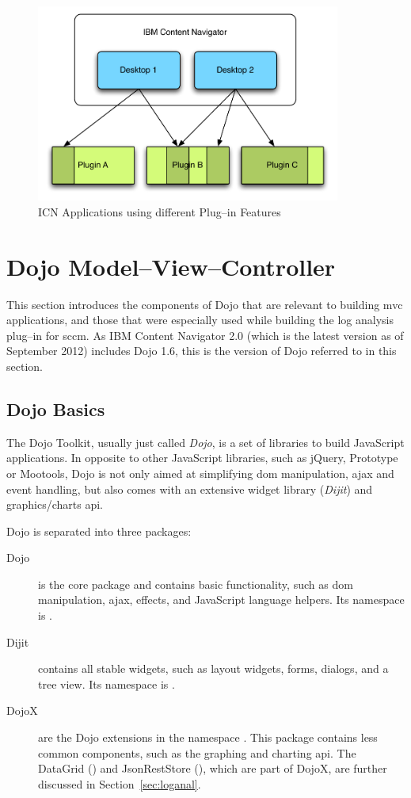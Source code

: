 \begin{figure}[H]
	\centering
	\includegraphics[width=10cm]{images/nexusapps.pdf}
	\caption{ICN Applications using different Plug--in Features}
	\label{fig:nexusapps}
\end{figure}

\section{Dojo Model--View--Controller}
\label{sec:dojo}
This section introduces the components of Dojo that are relevant to building \acl{mvc} applications, and those that were especially used while building the log analysis plug--in for \ac{sccm}. As IBM Content Navigator 2.0 (which is the latest version as of September 2012) includes Dojo 1.6, this is the version of Dojo referred to in this section.

\subsection{Dojo Basics}
The Dojo Toolkit, usually just called \emph{Dojo}, is a set of libraries to build JavaScript applications. In opposite to other JavaScript libraries, such as jQuery, Prototype or Mootools, Dojo is not only aimed at simplifying \ac{dom} manipulation, \ac{ajax} and event handling, but also comes with an extensive widget library (\emph{Dijit}) and graphics/charts \ac{api}.

Dojo is separated into three packages:
\begin{description}
	\item[Dojo] is the core package and contains basic functionality, such as \ac{dom} manipulation, \ac{ajax}, effects, and JavaScript language helpers. Its \gls{namespace} is .
	\item[Dijit] contains all stable widgets, such as layout widgets, forms, dialogs, and a tree view. Its namespace is .
	\item[DojoX] are the Dojo extensions in the namespace . This package contains less common components, such as the graphing and charting \ac{api}. The DataGrid () and JsonRestStore (), which are part of DojoX, are further discussed in Section~\ref{sec:loganal}.
\end{description}

